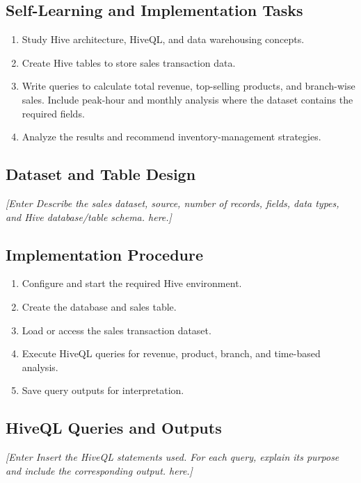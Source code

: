 \documentclass[12pt,a4paper]{report}
\newcommand{\placeholder}[1]{\textit{[Enter #1 here.]}}
\begin{document}
\subsection{Self-Learning and Implementation Tasks}
\begin{enumerate}
    \item Study Hive architecture, HiveQL, and data warehousing concepts.
    \item Create Hive tables to store sales transaction data.
    \item Write queries to calculate total revenue, top-selling products,
    and branch-wise sales. Include peak-hour and monthly analysis where
    the dataset contains the required fields.
    \item Analyze the results and recommend inventory-management strategies.
\end{enumerate}

\subsection{Dataset and Table Design}
\placeholder{Describe the sales dataset, source, number of records, fields,
data types, and Hive database/table schema.}

\subsection{Implementation Procedure}
\begin{enumerate}
    \item Configure and start the required Hive environment.
    \item Create the database and sales table.
    \item Load or access the sales transaction dataset.
    \item Execute HiveQL queries for revenue, product, branch, and time-based analysis.
    \item Save query outputs for interpretation.
\end{enumerate}

\subsection{HiveQL Queries and Outputs}
\placeholder{Insert the HiveQL statements used. For each query, explain
its purpose and include the corresponding output.}
\end{document}
